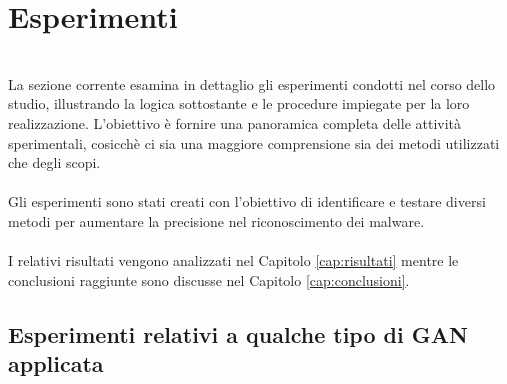 \section{Esperimenti}
~\\
\indent La sezione corrente esamina in dettaglio gli esperimenti condotti nel corso dello studio, illustrando la logica sottostante e le procedure impiegate per la loro realizzazione. 
L'obiettivo è fornire una panoramica completa delle attività sperimentali, cosicchè ci sia una maggiore comprensione sia dei metodi utilizzati che degli scopi.
\\\\
Gli esperimenti sono stati creati con l'obiettivo di identificare e testare diversi metodi per aumentare la precisione nel riconoscimento dei malware.
\\\\
I relativi risultati vengono analizzati nel Capitolo \ref{cap:risultati} mentre le conclusioni raggiunte sono discusse nel Capitolo \ref{cap:conclusioni}.

\subsection{Esperimenti relativi a qualche tipo di GAN applicata}
~\\ 


